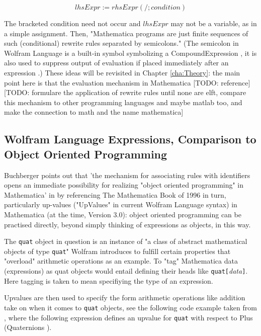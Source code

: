 \[
lhsExpr := rhsExpr (/; condition) 
\]

The bracketed condition need not occur and  \( lhsExpr \) may not be a variable, as in a simple assignment. Then, "Mathematica programs are just finite sequences of such (conditional) rewrite rules separated by semicolons." \cite[p. 5]{buchberger_mathematica_1996} (The semicolon in Wolfram Language is a built-in symbol symbolizing a CompoundExpression \cite{noauthor_compoundexpressionwolfram_nodate}, it is also used to suppress output of evaluation if placed immediately after an expression \cite{noauthor_suppress_nodate}.) These ideas will be revisited in Chapter \ref{cha:Theory}: the main point here is that the evaluation mechanism in Mathematica [TODO: reference] [TODO: formulare the application of rewrite rules until none are elft, compare this mechanism to other programming languages and maybe matlab too, and make the connection to math and the name mathematica]

\subsection{Wolfram Language Expressions, Comparison to Object Oriented Programming} \label{oop}

Buchberger points out that 'the mechanism for associating rules with identifiers opens an immediate possibility for realizing "object oriented programming" in Mathematica' in \cite[p. 7]{buchberger_mathematica_1996} by referencing The Mathematica Book of 1996 in turn, particularly up-values ("UpValues" in current Wolfram Language syntax) in Mathematica (at the time, Version 3.0): object oriented programming can be practised directly, beyond simply thinking of expressions as objects, in this way.

The \lstinline+quat+ object in question is an instance of "a class of abstract mathematical objects of type \lstinline+quat+" \cite[At the end of section 2.4.10, Associating Definitions with Different Symbols]{noauthor_wolfram_nodate} Wolfram introduces to fulfill certain properties that "overload" arithmetic operations as an example. To "tag" Mathematica data (expressions) as quat objects would entail defining their heads like \lstinline+quat[+\textit{data}\lstinline+]+. Here tagging is taken to mean specifiying the type of an expression.

Upvalues are then used to specify the form arithmetic operations like addition take on when it comes to \lstinline+quat+ objects, see the following code example taken from \cite[At the end of section 2.4.10, Associating Definitions with Different Symbols]{noauthor_wolfram_nodate}, where the following expression defines an upvalue for \lstinline+quat+ with respect to Plus (Quaternions \cite{misc_quaternion_2024}).

